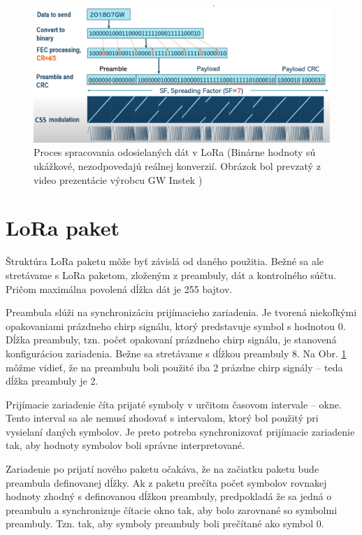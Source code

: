 \documentclass[slovak,master]{diploma}
\begin{document}
\begin{figure}
	\centering
	\includegraphics[width=1\textwidth]{Figures/loraModulation2.png}
	\caption[Proces spracovania odosielaných dát v LoRa]{Proces spracovania odosielaných dát v LoRa (Binárne hodnoty sú ukážkové, nezodpovedajú reálnej konverzií. Obrázok bol prevzatý z video prezentácie výrobcu GW Instek \cite{loratester})}
	\label{fig:loraModulation}
\end{figure}

\section{LoRa paket}
Štruktúra LoRa paketu môže byť závislá od daného použitia. Bežné sa ale stretávame s LoRa paketom, zloženým z preambuly, dát a kontrolného súčtu. Pričom maximálna 
povolená dĺžka dát je 255 bajtov.

Preambula slúži na synchronizáciu prijímacieho zariadenia. Je tvorená niekoľkými opakovaniami prázdneho chirp signálu, ktorý predstavuje symbol s hodnotou 0. 
Dĺžka preambuly, tzn. počet opakovaní prázdneho chirp signálu, je stanovená konfiguráciou zariadenia. Bežne sa stretávame s dĺžkou preambuly 8.
Na Obr. \ref{fig:loraModulation} môžme vidieť, že na preambulu boli použité iba 2 prázdne chirp signály -- teda dĺžka preambuly je 2.

Prijímacie zariadenie číta prijaté symboly v určitom časovom intervale -- okne. Tento interval sa ale nemusí zhodovať s intervalom, ktorý bol použitý pri vysielaní daných symbolov.
Je preto potreba synchronizovať prijímacie zariadenie tak, aby hodnoty symbolov boli správne interpretované.

Zariadenie po prijatí nového paketu očakáva, že na začiatku paketu bude preambula definovanej dĺžky. Ak z paketu prečíta počet symbolov rovnakej hodnoty zhodný 
s definovanou dĺžkou preambuly, predpokladá že sa jedná o preambulu a synchronizuje čítacie okno tak, aby bolo zarovnané so symbolmi preambuly. Tzn. tak, aby symboly preambuly boli 
prečítané ako symbol 0.
\end{document}
